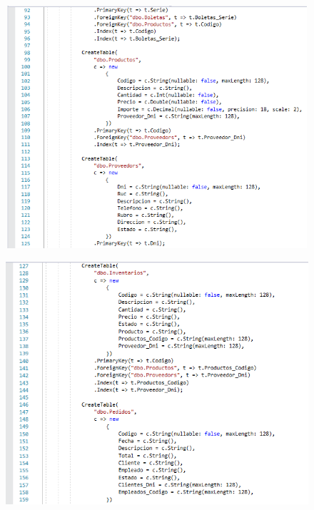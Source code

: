 \documentclass[12pt,a4paper,oneside]{book}
\begin{document}
\begin{enumerate}
\begin{enumerate}
\begin{enumerate}
								\begin{figure}[htb]
									\centering \includegraphics[width=12cm, height=9cm]{img/Migraciones/7clasemigra.png}
								\end{figure}
					\newpage		
								\begin{figure}[htb]
									\centering \includegraphics[width=12cm, height=9cm]{img/Migraciones/8clasemigra.png}
								\end{figure}
								

\end{enumerate}
\end{enumerate}
\end{enumerate}
\end{document}
